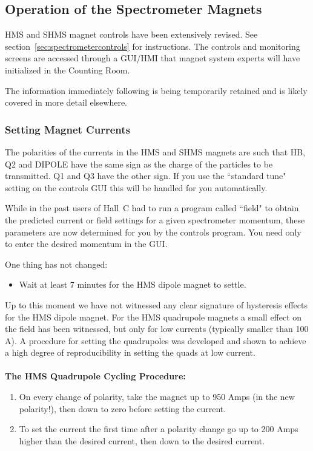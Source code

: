 {\subsection{Operation of the Spectrometer Magnets}
\label{ssec:operatemagnets}

HMS and SHMS magnet controls have been extensively revised. See
section~\ref{sec:spectrometercontrols}
for instructions. The controls and
monitoring screens are accessed through a GUI/HMI that magnet system
experts will have initialized in the Counting Room.

The information immediately following is being temporarily retained and is likely
covered in more detail elsewhere.

\subsubsection{Setting Magnet Currents}

The polarities of the currents in the HMS and SHMS magnets are such that
HB, Q2 and DIPOLE have the same sign as the charge of the particles
to be transmitted. Q1 and Q3 have the other sign. If you use the ``standard
tune" setting on the controls GUI this will be handled for you automatically.

While in the past users of Hall~C had to run a program called ``field" to obtain
the predicted current or field settings for a given spectrometer momentum,
these parameters are now determined for you by the controls program. You
need only to enter the desired momentum in the GUI.

One thing has not changed:
\begin{itemize}
\item{Wait at least 7 minutes for the HMS dipole magnet to settle.}
\end{itemize}

Up to this moment we have not witnessed any clear signature of hysteresis
effects for the HMS dipole magnet. For the HMS quadrupole magnets a small effect
on the field has been witnessed, but only for low currents (typically smaller
than 100 A). A procedure for setting the quadrupoles was developed
and shown to achieve a high
degree of reproducibility in setting the quads at low current.
\\
\\
\textbf{The HMS Quadrupole Cycling Procedure:}
\begin{enumerate}
  \item{On every change of polarity, take the magnet up to 950 Amps
     (in the new polarity!), then down to zero before setting the
     current.}
  \item{To set the current the first time after a polarity change
     go up to 200 Amps higher than the desired current,
     then down to the desired current.

}
\end{enumerate}}
